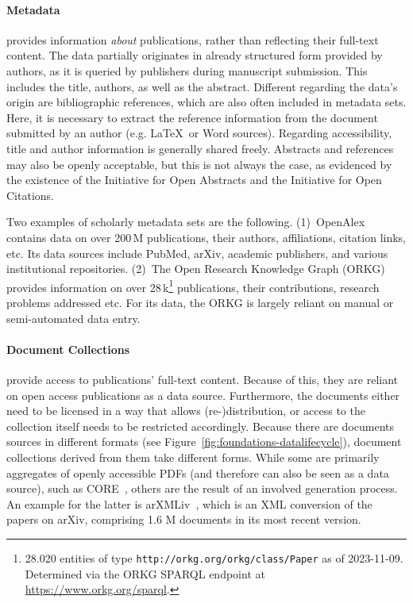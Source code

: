 \paragraph{Metadata}
provides information \emph{about} publications, rather than reflecting their full-text content. The data partially originates in already structured form provided by authors, as it is queried by publishers during manuscript submission. This includes the title, authors, as well as the abstract. Different regarding the data's origin are bibliographic references, which are also often included in metadata sets. Here, it is necessary to extract the reference information from the document submitted by an author (e.g. \LaTeX\ or Word sources). Regarding accessibility, title and author information is generally shared freely. Abstracts and references may also be openly acceptable, but this is not always the case, as evidenced by the existence of the Initiative for Open Abstracts and the Initiative for Open Citations.


Two examples of scholarly metadata sets are the following. (1)~OpenAlex~\cite{openalex} contains data on over 200\,M publications, their authors, affiliations, citation links, etc. Its data sources include PubMed, arXiv, academic publishers, and various institutional repositories.%
 (2)~The Open Research Knowledge Graph (ORKG)~\cite{orkg1,orkg2} provides information on over 28\,k\footnote{28.020 entities of type \texttt{http://orkg.org/orkg/class/Paper} as of 2023-11-09. Determined via the ORKG SPARQL endpoint at \url{https://www.orkg.org/sparql}.} publications, their contributions, research problems addressed etc. For its data, the ORKG is largely reliant on manual or semi-automated data entry.

\paragraph{Document Collections} provide access to publications' full-text content. Because of this, they are reliant on open access publications as a data source. Furthermore, the documents either need to be licensed in a way that allows (re-)distribution, or access to the collection itself needs to be restricted accordingly. Because there are documents sources in different formats (see Figure~\ref{fig:foundations-datalifecycle}), document collections derived from them take different forms. While some are primarily aggregates of openly accessible PDFs (and therefore can also be seen as a data source), such as CORE~\cite{core}, others are the result of an involved generation process. An example for the latter is arXMLiv~\cite{arXMLiv}, which is an XML conversion of the papers on arXiv, comprising 1.6 M documents in its most recent version.

